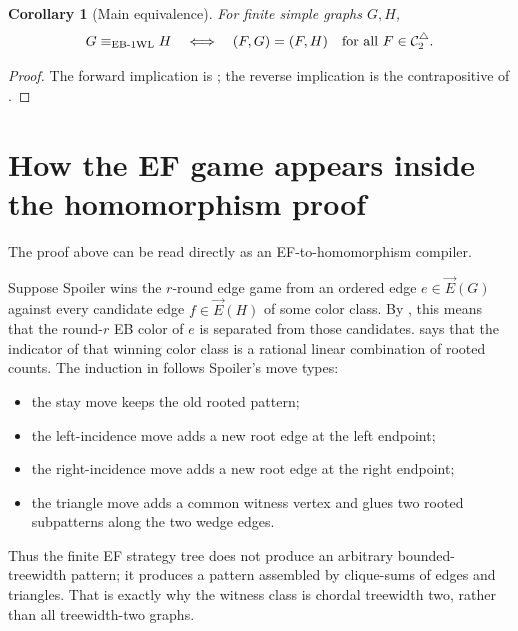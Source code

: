 \documentclass[11pt]{article}
\newtheorem{corollary}[theorem]{Corollary}
\let\hom\relax
\DeclareMathOperator{\hom}{hom}
\newcommand{\cC}{\mathcal{C}}
\newcommand{\vecE}{\overrightarrow{E}}
\begin{document}
\begin{corollary}[Main equivalence]
\label{cor:main}
For finite simple graphs $G,H$,
\[
G\equiv_{\mathrm{EB\text{-}1WL}}H
\quad\Longleftrightarrow\quad
\hom(F,G)=\hom(F,H)\quad\text{for all }F\in\cC_2^\triangle.
\]
\end{corollary}

\begin{proof}
The forward implication is ; the reverse implication is the contrapositive of .
\end{proof}

\section{How the EF game appears inside the homomorphism proof}
\label{sec:ef-inside}

The proof above can be read directly as an EF-to-homomorphism compiler.

Suppose Spoiler wins the $r$-round edge game from an ordered edge $e\in\vecE(G)$ against every candidate edge $f\in\vecE(H)$ of some color class.  By , this means that the round-$r$ EB color of $e$ is separated from those candidates.   says that the indicator of that winning color class is a rational linear combination of rooted counts.  The induction in  follows Spoiler's move types:
\begin{itemize}[leftmargin=2.2em]
\item the stay move keeps the old rooted pattern;
\item the left-incidence move adds a new root edge at the left endpoint;
\item the right-incidence move adds a new root edge at the right endpoint;
\item the triangle move adds a common witness vertex and glues two rooted subpatterns along the two wedge edges.
\end{itemize}
Thus the finite EF strategy tree does not produce an arbitrary bounded-treewidth pattern; it produces a pattern assembled by clique-sums of edges and triangles.  That is exactly why the witness class is chordal treewidth two, rather than all treewidth-two graphs.
\end{document}

